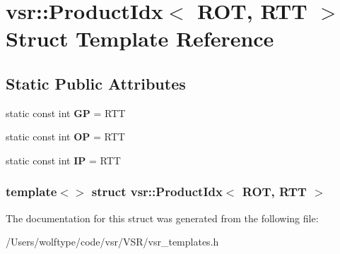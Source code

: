 \hypertarget{structvsr_1_1_product_idx_3_01_r_o_t_00_01_r_t_t_01_4}{\section{vsr\-:\-:Product\-Idx$<$ R\-O\-T, R\-T\-T $>$ Struct Template Reference}
\label{structvsr_1_1_product_idx_3_01_r_o_t_00_01_r_t_t_01_4}
}
\subsection*{Static Public Attributes}
\begin{DoxyCompactItemize}
\item 
\hypertarget{structvsr_1_1_product_idx_3_01_r_o_t_00_01_r_t_t_01_4_a2110a48b3b172b1199d13952ac7c1dac}{static const int {\bfseries G\-P} = R\-T\-T}\label{structvsr_1_1_product_idx_3_01_r_o_t_00_01_r_t_t_01_4_a2110a48b3b172b1199d13952ac7c1dac}

\item 
\hypertarget{structvsr_1_1_product_idx_3_01_r_o_t_00_01_r_t_t_01_4_ab774ae4a72f420141867f785690916de}{static const int {\bfseries O\-P} = R\-T\-T}\label{structvsr_1_1_product_idx_3_01_r_o_t_00_01_r_t_t_01_4_ab774ae4a72f420141867f785690916de}

\item 
\hypertarget{structvsr_1_1_product_idx_3_01_r_o_t_00_01_r_t_t_01_4_ae46daa58274c8b8a0d04e2369f4e0b13}{static const int {\bfseries I\-P} = R\-T\-T}\label{structvsr_1_1_product_idx_3_01_r_o_t_00_01_r_t_t_01_4_ae46daa58274c8b8a0d04e2369f4e0b13}

\end{DoxyCompactItemize}
\subsubsection*{template$<$$>$ struct vsr\-::\-Product\-Idx$<$ R\-O\-T, R\-T\-T $>$}



The documentation for this struct was generated from the following file\-:\begin{DoxyCompactItemize}
\item 
/\-Users/wolftype/code/vsr/\-V\-S\-R/vsr\-\_\-templates.\-h\end{DoxyCompactItemize}
